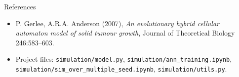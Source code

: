 \documentclass[10pt,aspectratio=169]{beamer}
\begin{document}
\begin{frame}[c]{References}
\small
\begin{itemize}
  \item P. Gerlee, A.R.A. Anderson (2007), \emph{An evolutionary hybrid cellular automaton model of solid tumour growth}, Journal of Theoretical Biology 246:583--603.
  \item Project files: \texttt{simulation/model.py}, \texttt{simulation/ann\_training.ipynb}, \texttt{simulation/sim\_over\_multiple\_seed.ipynb}, \texttt{simulation/utils.py}.
\end{itemize}
\end{frame}
\end{document}
